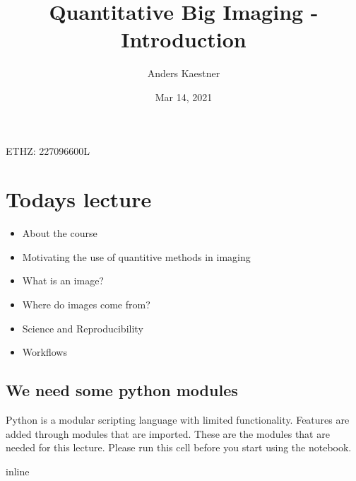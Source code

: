 \documentclass[letterpaper,10pt,english]{sphinxmanual}
\title{Quantitative Big Imaging - Introduction}
\date{Mar 14, 2021}
\author{Anders Kaestner}
\begin{document}
\pagestyle{empty}
\sphinxmaketitle
\pagestyle{plain}
\sphinxtableofcontents
\pagestyle{normal}
\label{\detokenize{01-Introduction::doc}}


\sphinxAtStartPar
{} ETHZ: 227\sphinxhyphen{}0966\sphinxhyphen{}00L




\chapter{Todays lecture}
\label{\detokenize{01-Introduction:todays-lecture}}\begin{itemize}
\item {} 
\sphinxAtStartPar
About the course

\item {} 
\sphinxAtStartPar
Motivating the use of quantitive methods in imaging

\item {} 
\sphinxAtStartPar
What is an image?

\item {} 
\sphinxAtStartPar
Where do images come from?

\item {} 
\sphinxAtStartPar
Science and Reproducibility

\item {} 
\sphinxAtStartPar
Workflows

\end{itemize}


\section{We need some python modules}
\label{\detokenize{01-Introduction:we-need-some-python-modules}}
\sphinxAtStartPar
Python is a modular scripting language with limited functionality. Features are added through modules that are imported.
These are the modules that are needed for this lecture. Please run this cell before you start using the notebook.

\begin{sphinxVerbatim}[commandchars=\\\{\}]
   
   
   
 inline

   
   
   
   
   
 
   
\end{sphinxVerbatim}
\end{document}
